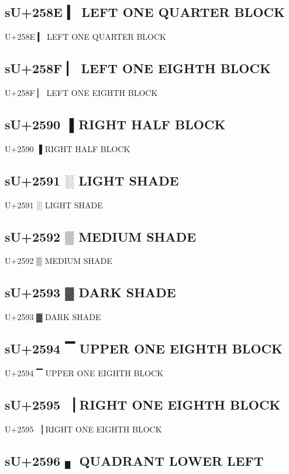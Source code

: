 \subsection{sU+258E ▎ LEFT ONE QUARTER BLOCK}

U+258E ▎ LEFT ONE QUARTER BLOCK

\subsection{sU+258F ▏ LEFT ONE EIGHTH BLOCK}

U+258F ▏ LEFT ONE EIGHTH BLOCK

\subsection{sU+2590 ▐ RIGHT HALF BLOCK}

U+2590 ▐ RIGHT HALF BLOCK

\subsection{sU+2591 ░ LIGHT SHADE}

U+2591 ░ LIGHT SHADE

\subsection{sU+2592 ▒ MEDIUM SHADE}

U+2592 ▒ MEDIUM SHADE

\subsection{sU+2593 ▓ DARK SHADE}

U+2593 ▓ DARK SHADE

\subsection{sU+2594 ▔ UPPER ONE EIGHTH BLOCK}

U+2594 ▔ UPPER ONE EIGHTH BLOCK

\subsection{sU+2595 ▕ RIGHT ONE EIGHTH BLOCK}

U+2595 ▕ RIGHT ONE EIGHTH BLOCK

\subsection{sU+2596 ▖ QUADRANT LOWER LEFT}

